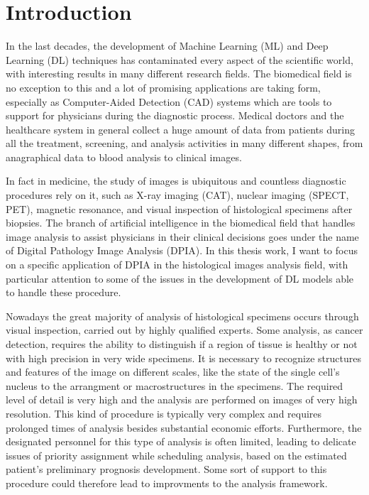 \chapter*{Introduction}
\label{chap:intro}
In the last decades, the development of Machine Learning (ML) and Deep Learning (DL) techniques has contaminated every aspect of the scientific world, with interesting results in many different research fields. The biomedical field is no exception to this and a lot of promising applications are taking form, especially as Computer-Aided Detection (CAD) systems which are tools to support for physicians during the diagnostic process. Medical doctors and the healthcare system in general collect a huge amount of data from patients during all the treatment, screening, and analysis activities in many different shapes, from anagraphical data to blood analysis to clinical images.

In fact in medicine, the study of images is ubiquitous and countless diagnostic procedures rely on it, such as X-ray imaging (CAT), nuclear imaging (SPECT, PET), magnetic resonance, and visual inspection of histological specimens after biopsies. The branch of artificial intelligence in the biomedical field that handles image analysis to assist physicians in their clinical decisions goes under the name of Digital Pathology Image Analysis (DPIA). In this thesis work, I want to focus on a specific application of DPIA in the histological images analysis field, with particular attention to some of the issues in the development of DL models able to handle these procedure.

Nowadays the great majority of analysis of histological specimens occurs through visual inspection, carried out by highly qualified experts. Some analysis, as cancer detection, requires the ability to distinguish if a region of tissue is healthy or not with high precision in very wide specimens.  It is necessary to recognize structures and features of the image on different scales, like the state of the single cell's nucleus to the arrangment or macrostructures in the specimens. The required level of detail is very high and the analysis are performed on images of very high resolution. This kind of procedure is typically very complex and requires prolonged times of analysis besides substantial economic efforts. Furthermore, the designated personnel for this type of analysis is often limited, leading to delicate issues of priority assignment while scheduling analysis, based on the estimated patient's preliminary prognosis development. Some sort of support to this procedure could therefore lead to improvments to the analysis framework.

